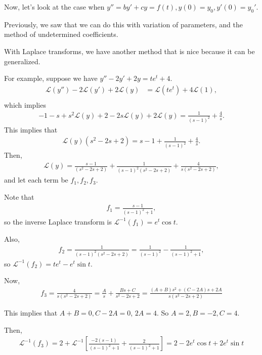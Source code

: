 \documentclass{article}
\newcommand{\LL}{\mathcal{L}}
\begin{document}
Now, let's look at the case when $y'' = by' + cy = f(t), y(0) = y_0, y'(0) = y_0'$.

Previously, we saw that we can do this with variation of parameters, and the method of undetermined coefficients.

With Laplace transforms, we have another method that is nice because it can be generalized.

For example, suppose we have $y'' - 2y' + 2y = te^t + 4$.
\begin{align*}
  \LL (y'' ) - 2 \LL (y') + 2 \LL(y) &= \LL (t e^t) + 4 \LL(1), \\
\end{align*}
which implies
\begin{align*}
  -1 - s + s^2 \LL(y) + 2 - 2s \LL (y) + 2 \LL(y) = \frac{1}{(s-1)^2} + \frac{4}{s}.
\end{align*}
This implies that
\begin{align*}
  \LL(y) (s^2 - 2s + 2) = s - 1 + \frac{1}{(s-1)^2} + \frac{4}{s}.
\end{align*}
Then,
\begin{align*}
\LL(y) = \frac{s-1}{(s^2 - 2s + 2)} + \frac{1}{(s-1)^2 (s^2 - 2s + 2)} + \frac{4}{s(s^2 - 2s + 2)},
\end{align*}
and let each term be $f_1, f_2, f_3$.

Note that
\begin{align*}
  f_1 = \frac{s-1}{(s-1)^2 + 1},
\end{align*}
so the inverse Laplace transform is $\LL^{-1}(f_1) = e^t \cos t$.

Also,
\begin{align*}
  f_2 = \frac{1}{(s-1)^2 (s^2 - 2s + 2)} = \frac{1}{(s-1)^2} - \frac{1}{(s-1)^2 + 1},
\end{align*}
so $\LL^{-1}(f_2) = t e^t - e^t \sin t$.

Now,
\begin{align*}
  f_3 = \frac{4}{s(s^2 - 2s+2)} = \frac{A}{s} + \frac{Bs + C}{s^2 - 2s + 2} = \frac{(A + B)s^2 + (C - 2A)s + 2A}{s(s^2 - 2s + 2)}
\end{align*}

This implies that $A + B = 0, C - 2A = 0$, $2A = 4$.  So $A = 2, B = -2, C = 4$.

Then,
\begin{align*}
  \LL^{-1}(f_3) = 2 + \LL^{-1} \left [ \frac{-2(s-1)}{(s-1)^2 + 1} + \frac{2}{(s-1)^2 + 1} \right ] = 2 -2 e^t \cos t  + 2 e^t \sin t
\end{align*}
\end{document}
